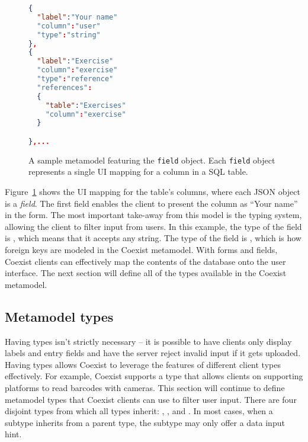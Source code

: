 \begin{figure}[h!]
\begin{lstlisting}[language=json]
{
  "label":"Your name"
  "column":"user"
  "type":"string"
},
{
  "label":"Exercise"
  "column":"exercise"
  "type":"reference"
  "references":
  {
    "table":"Exercises"
    "column":"exercise"
  }

},...
\end{lstlisting}
\caption{A sample metamodel featuring the \texttt{field} object. Each
  \texttt{field} object represents a single UI mapping for a column in a SQL
table.}
\label{fig:json_field}
\end{figure}

Figure~\ref{fig:json_field} shows the UI mapping for the table's columns, where
each JSON object is a \textit{field}. The first field enables the client to
present the  column as ``Your name'' in the form. The most important
take-away from this model is the typing system, allowing the client
to filter input from users. In this example, the type of the  field is
, which means that it accepts any string. The type of the
 field is , which is how foreign keys are modeled
in the Coexist metamodel. With forms and fields, Coexist clients can effectively
map the contents of the database onto the user interface. The next section will
define all of the types available in the Coexist metamodel.


\subsection{Metamodel types}  \label{sec:types}

Having types isn't strictly necessary -- it is possible to have clients only
display labels and entry fields and have the server reject invalid input if
it gets uploaded. Having types allows Coexist to leverage the features of
different client types effectively. For example, Coexist supports a
 type that allows clients on supporting platforms to read barcodes
with cameras. This section will continue to define metamodel types that Coexist
clients can use to filter user input. There are four disjoint types from which
all types inherit: , ,  and .
In most cases, when a subtype inherits from a parent type, the subtype may only
offer a data input hint.


